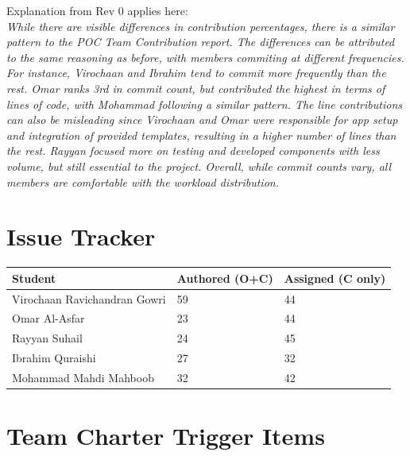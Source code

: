 \documentclass{article}
\begin{document}
Explanation from Rev 0 applies here: \\
\textit{While there are visible differences in contribution percentages, there is a similar pattern to the POC Team Contribution report. The differences can be attributed to the same reasoning as before, with members commiting at different frequencies. For instance, Virochaan and Ibrahim tend to commit more frequently than the rest. Omar ranks 3rd in commit count, but contributed the highest in terms of lines of code, with Mohammad following a similar pattern. The line contributions can also be misleading since Virochaan and Omar were responsible for app setup and integration of provided templates, resulting in a higher number of lines than the rest. Rayyan focused more on testing and developed components with less volume, but still essential to the project. Overall, while commit counts vary, all members are comfortable with the workload distribution.}


\section{Issue Tracker}

\begin{table}[H]
\centering
\begin{tabular}{lll}
\toprule
\textbf{Student} & \textbf{Authored (O+C)} & \textbf{Assigned (C only)}\\
\midrule
Virochaan Ravichandran Gowri & 59 & 44 \\
Omar Al-Asfar & 23 & 44 \\
Rayyan Suhail & 24 & 45 \\
Ibrahim Quraishi & 27 & 32 \\
Mohammad Mahdi Mahboob & 32 & 42 \\
\bottomrule
\end{tabular}
\end{table}

\section{Team Charter Trigger Items}
\end{document}
